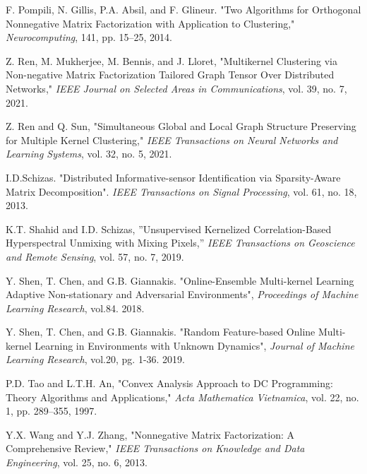 \documentclass[10pt,final]{IEEEtran}
\begin{document}
\begin{thebibliography}{1}
F. Pompili, N. Gillis, P.A. Absil, and F. Glineur. "Two Algorithms for Orthogonal Nonnegative Matrix Factorization with Application to Clustering," \emph{Neurocomputing}, 141, pp. 15--25, 2014.

Z. Ren, M. Mukherjee, M. Bennis, and J. Lloret, "Multikernel Clustering via Non-negative Matrix Factorization Tailored Graph Tensor Over Distributed Networks," \emph{IEEE Journal on Selected Areas in Communications}, vol. 39, no. 7,  2021.

Z. Ren and Q. Sun, "Simultaneous Global and Local Graph Structure Preserving for Multiple Kernel Clustering," \emph{IEEE Transactions on Neural Networks and Learning Systems}, vol. 32, no. 5, 2021.

I.D.Schizas. "Distributed Informative-sensor Identification via Sparsity-Aware Matrix Decomposition". \emph{IEEE Transactions on Signal Processing}, vol. 61, no. 18, 2013.

K.T. Shahid and I.D. Schizas, ''Unsupervised Kernelized Correlation-Based Hyperspectral Unmixing with Mixing Pixels,'' \emph{IEEE Transactions on Geoscience and Remote Sensing}, vol. 57, no. 7, 2019.

Y. Shen, T. Chen, and G.B. Giannakis. "Online-Ensemble Multi-kernel Learning Adaptive Non-stationary and Adversarial Environments", \emph{Proceedings of Machine Learning Research}, vol.84. 2018.

Y. Shen, T. Chen, and G.B. Giannakis. "Random Feature-based Online Multi-kernel Learning in Environments with Unknown Dynamics", \emph{Journal of Machine Learning Research}, vol.20, pg. 1-36. 2019.

P.D. Tao and L.T.H. An, "Convex Analysis Approach to DC Programming: Theory Algorithms and Applications," \emph{Acta Mathematica Vietnamica}, vol. 22, no. 1, pp. 289--355, 1997.



Y.X. Wang and Y.J. Zhang, "Nonnegative Matrix Factorization: A Comprehensive Review," \emph{IEEE Transactions on Knowledge and Data Engineering}, vol. 25, no. 6, 2013.


%
\end{thebibliography} 
\end{document}
